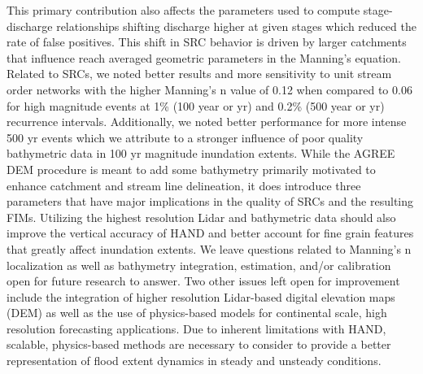 \documentclass[draft]{dependencies/agujournal2019}
\begin{document}
This primary contribution also affects the parameters used to compute stage-discharge relationships shifting discharge higher at given stages which reduced the rate of false positives.
This shift in SRC behavior is driven by larger catchments that influence reach averaged geometric parameters in the Manning's equation.
Related to SRCs, we noted better results and more sensitivity to unit stream order networks with the higher Manning's n value of 0.12 when compared to 0.06 for high magnitude events at 1\% (100 year or yr) and 0.2\% (500 year or yr) recurrence intervals.
Additionally, we noted better performance for more intense 500 yr events which we attribute to a stronger influence of poor quality bathymetric data in 100 yr magnitude inundation extents.
While the AGREE DEM procedure is meant to add some bathymetry primarily motivated to enhance catchment and stream line delineation, it does introduce three parameters that have major implications in the quality of SRCs and the resulting FIMs.
Utilizing the highest resolution Lidar and bathymetric data should also improve the vertical accuracy of HAND and better account for fine grain features that greatly affect inundation extents.
We leave questions related to Manning's n localization as well as bathymetry integration, estimation, and/or calibration open for future research to answer.
Two other issues left open for improvement include the integration of higher resolution Lidar-based digital elevation maps (DEM) as well as the use of physics-based models for continental scale, high resolution forecasting applications.
Due to inherent limitations with HAND, scalable, physics-based methods are necessary to consider to provide a better representation of flood extent dynamics in steady and unsteady conditions.
\clearpage
\end{document}
